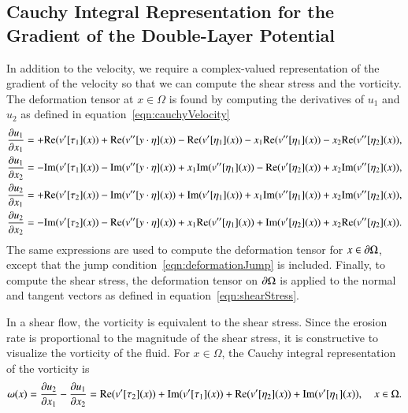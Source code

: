 \documentclass[preprint, 10pt]{elsarticle}
\begin{document}
\subsection{Cauchy Integral Representation for the Gradient of the
Double-Layer Potential}
\label{sec:gradDLPcomplex}
In addition to the velocity, we require a complex-valued representation
of the gradient of the velocity so that we can compute the shear stress
and the vorticity.  The deformation tensor at $x \in \Omega$ is found by
computing the derivatives of $u_1$ and $u_2$ as defined in
equation~\eqref{eqn:cauchyVelocity}  
\begin{equation}
\label{eqn:cauchyGradient}
  \begin{aligned}
    \frac{\partial u_1}{\partial x_1} &= +{\operatorname{Re}} (v'[\tau_1](x)) + 
      {\operatorname{Re}} (v''[y\cdot\eta](x)) - {\operatorname{Re}} (v'[\eta_1](x)) - 
      x_1{\operatorname{Re}} (v''[\eta_1](x)) - x_2{\operatorname{Re}} (v''[\eta_2](x)), \\
    \frac{\partial u_1}{\partial x_2} &= - {\operatorname{Im}} (v'[\tau_1](x)) - 
      {\operatorname{Im}} (v''[y\cdot\eta](x)) + x_1{\operatorname{Im}} (v''[\eta_1](x)) - 
      {\operatorname{Re}} (v'[\eta_2](x)) + x_2{\operatorname{Im}} (v''[\eta_2](x)), \\
    \frac{\partial u_2}{\partial x_1} &= +{\operatorname{Re}} (v'[\tau_2](x)) - 
      {\operatorname{Im}} (v''[y\cdot\eta](x)) + {\operatorname{Im}} (v'[\eta_1](x)) +
      x_1{\operatorname{Im}} (v''[\eta_1](x)) + x_2{\operatorname{Im}} (v''[\eta_2](x)), \\
    \frac{\partial u_2}{\partial x_2} &= -{\operatorname{Im}} (v'[\tau_2](x)) - 
      {\operatorname{Re}} (v''[y\cdot\eta](x)) + x_1{\operatorname{Re}} (v''[\eta_1](x)) +
      {\operatorname{Im}} (v'[\eta_2](x)) + x_2{\operatorname{Re}} (v''[\eta_2](x)).
  \end{aligned}
\end{equation}
The same expressions are used to compute the deformation tensor for $x
\in {\partial}\Omega$, except that the jump
condition~\eqref{eqn:deformationJump} is included.  Finally, to compute
the shear stress, the deformation tensor on ${\partial}\Omega$ is applied to
the normal and tangent vectors as defined in
equation~\eqref{eqn:shearStress}.

In a shear flow, the vorticity is equivalent to the shear stress.  Since
the erosion rate is proportional to the magnitude of the shear stress,
it is constructive to visualize the vorticity of the fluid.  For $x \in
\Omega$, the Cauchy integral representation of the vorticity is
\begin{align}
  \omega(x) = \frac{\partial u_2}{\partial x_1} - \frac{\partial u_1}{\partial x_2} = 
{\operatorname{Re}} (v'[\tau_2](x)) + {\operatorname{Im}} (v'[\tau_1](x)) 
 + {\operatorname{Re}} (v'[\eta_2](x))+ {\operatorname{Im}} (v'[\eta_1](x)), \quad x \in \Omega.
\end{align}
\end{document}
